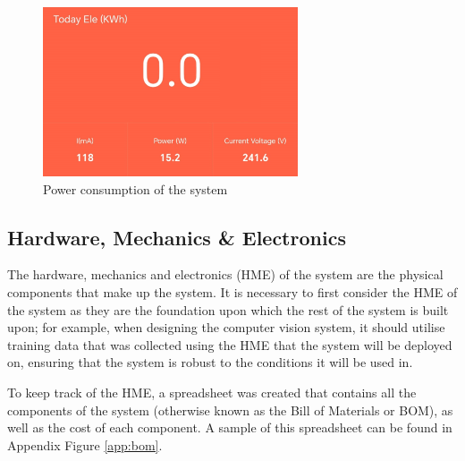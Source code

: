 \begin{figure}[t]
\begin{minipage}[t]{0.22\textwidth}
      \centering
      \includegraphics[width=\textwidth,height=5cm, keepaspectratio]{imgs/parts/powermeter.png}
      \caption{Power consumption of the system}
      \label{fig:powermeter}
  \end{minipage}
\end{figure}

\subsection{Hardware, Mechanics \& Electronics}
The hardware, mechanics and electronics (HME) of the system are the physical components that make up the system.
It is necessary to first consider the HME of the system as they are the foundation upon which the rest of the system is built upon;
for example, when designing the computer vision system, it should utilise training data that was collected using the HME 
that the system will be deployed on, ensuring that the system is robust to the conditions it will be used in.

To keep track of the HME, a spreadsheet was created that contains all the components of the system (otherwise known as the Bill of Materials or BOM),
as well as the cost of each component. A sample of this spreadsheet can be found in Appendix Figure \ref{app:bom}.
